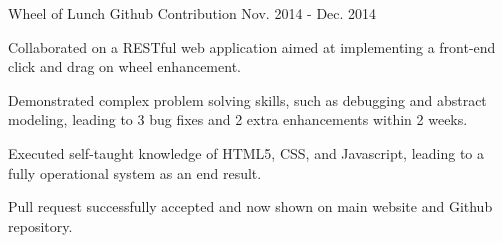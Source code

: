 \begin{cventries}
  \cvtechentry
    {Wheel of Lunch Github Contribution} %
    {} %
    {} %
    {Nov. 2014 - Dec. 2014} %
    {
      \begin{cvitems} %
        \item {Collaborated on a RESTful web application aimed at implementing a front-end click and drag on wheel enhancement.}
        \item {Demonstrated complex problem solving skills, such as debugging and abstract modeling, leading to 3 bug fixes and 2 extra enhancements within 2 weeks.}
        \item {Executed self-taught knowledge of HTML5, CSS, and Javascript, leading to a fully operational system as an end result.}
        \item {Pull request successfully accepted and now shown on main website and Github repository.}
      \end{cvitems}
    }
\end{cventries}
